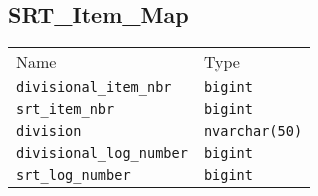 \subsection{SRT\_Item\_Map}
\begin{table}[h!]
\centering
\begin{tabular}{ll}
Name    & Type  \\
\verb|divisional_item_nbr|      &   \verb|bigint|       \\
\verb|srt_item_nbr|             &   \verb|bigint|       \\
\verb|division|                 &   \verb|nvarchar(50)| \\
\verb|divisional_log_number|    &   \verb|bigint|       \\
\verb|srt_log_number|           &   \verb|bigint|
\end{tabular}
\end{table}
